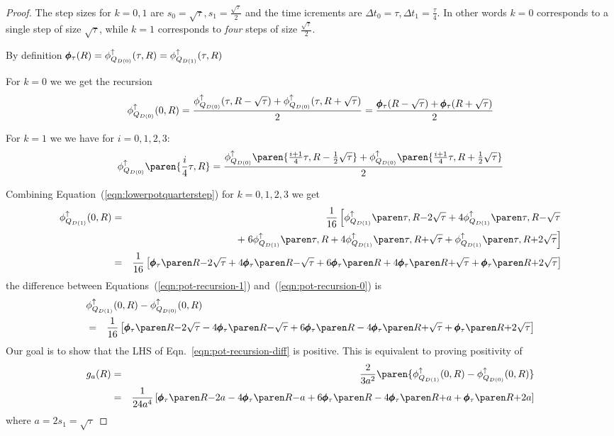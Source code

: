 \documentclass[anon,12pt]{colt2024} %
\begin{document}
\begin{proof} The step sizes for $k=0,1$ are
$s_0=\sqrt{\tau}, s_1=\frac{\sqrt{\tau}}{2}$ and the time icrements
are $\Delta t_0=\tau, \Delta t_1=\frac{\tau}{4}$. 
In other words $k=0$ corresponds to a single step of size $\sqrt{\tau}$, while $k=1$ corresponds
to {\em four} steps of size $\frac{\sqrt{\tau}}{2}$.

By definition $\pmb{\phi}_{\tau}(R)=\phi_{Q_{D(0)}}^{\uparrow}(\tau,R)=\phi_{Q_{D(1)}}^{\uparrow}(\tau,R)$

For $k=0$ we we get the recursion
\begin{equation}  \label{eqn:pot-recursion-0}
  \phi_{Q_{D(0)}}^{\uparrow}(0, R) =
  \frac{\phi_{Q_{D(0)}}^{\uparrow}(\tau,R-\sqrt{\tau})+
    \phi_{Q_{D(0)}}^{\uparrow}(\tau,R+\sqrt{\tau})}{2}
  =   \frac{\pmb{\phi}_{\tau}(R-\sqrt{\tau})+
    \pmb{\phi}_{\tau}(R+\sqrt{\tau})}{2}
\end{equation}

For $k=1$ we we have for $i=0,1,2,3$:
\begin{equation}   \label{eqn:lowerpotquarterstep}
   \lowerpotMdkpar{0}\paren{\frac{i}{4}\tau,\R}=
 \frac{\lowerpotMdkpar{0}\paren{\frac{i+1}{4}\tau,\R-\frac{1}{2}\sqrt{\tau}}+
   \lowerpotMdkpar{0}\paren{\frac{i+1}{4}\tau,\R+\frac{1}{2}\sqrt{\tau}}}{2}
 \end{equation}


Combining Equation~(\ref{eqn:lowerpotquarterstep}) for $k=0,1,2,3$ we get
\small
\begin{eqnarray} \label{eqn:pot-recursion-1}
  \lowerpotMdkpar{1}(0, \R)
  &=& \frac{1}{16}
      \left[\iter{-2}+4\iter{-} \right. \\
  &&+ \left. 6\iterzero +4\iter{+}+\iter{+2}\right] \nonumber\\
  &=& \frac{1}{16}
      \left[\fIter{-2}+4\fIter{-}+6\fIterzero +4\fIter{+}+\fIter{+2}\right] \nonumber
\end{eqnarray}
\normalsize the difference between
Equations~(\ref{eqn:pot-recursion-1}) and~(\ref{eqn:pot-recursion-0})
is \small
\begin{eqnarray} \label{eqn:pot-recursion-diff}
  \lefteqn{\lowerpotMdkpar{1}(0, \R) - \lowerpotMdkpar{0}(0, \R)}\\
&=&  \frac{1}{16}
\left[\fIter{-2}-4\fIter{-}+6\fIterzero -4\fIter{+}+\fIter{+2}\right] \nonumber
\end{eqnarray}
\normalsize Our goal is to show that the LHS of
Eqn.~\ref{eqn:pot-recursion-diff} is positive. This is equivalent to
proving positivity of
\begin{eqnarray}
g_a(\R) &=& \frac{2}{3a^2}\paren{\lowerpotMdkpar{1}(0, \R) -
  \lowerpotMdkpar{0}(0, \R)}\nonumber \\
& = &
\frac{1}{24 a^4}
      \left[\gIter{-2}-4\gIter{-}+6\gIterzero -4\gIter{+}+\gIter{+2}\right]
       \label{eqn:recursion-as-difference}
\end{eqnarray}
where $a=2 s_1=\sqrt{\tau}$
\end{proof}
\end{document}
